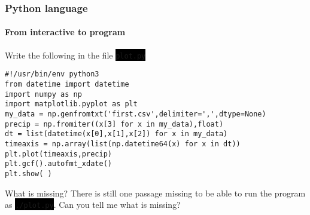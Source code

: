\documentclass[unknownkeysallowed, 10pt, a4 paper, handout]{beamer}
\newcommand{\code}[1]{\colorbox{black}{\color{green}\texttt{#1}}}
\begin{document}
\begin{frame}[fragile=singleslide]
  \frametitle{Python language}
  \framesubtitle{From interactive to program}
  \begin{exampleblock}{}
    Write the following in the file \code{plot.py}
    \small{
    \begin{verbatim}
#!/usr/bin/env python3
from datetime import datetime
import numpy as np
import matplotlib.pyplot as plt
my_data = np.genfromtxt('first.csv',delimiter=',',dtype=None)
precip = np.fromiter((x[3] for x in my_data),float)
dt = list(datetime(x[0],x[1],x[2]) for x in my_data)
timeaxis = np.array(list(np.datetime64(x) for x in dt))
plt.plot(timeaxis,precip)
plt.gcf().autofmt_xdate()
plt.show( )
    \end{verbatim}
    }
  \end{exampleblock}

  \begin{alertblock}{What is missing?}
    There is still one passage missing to be able to run the program as
      \code{./plot.py}. Can you tell me what is missing?
  \end{alertblock}
\end{frame}
\end{document}
